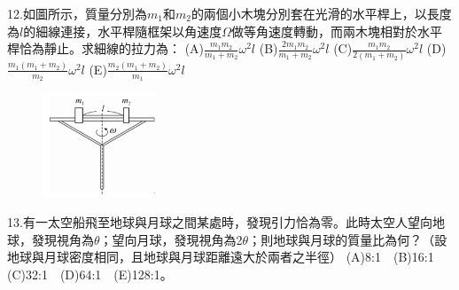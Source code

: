 \documentclass[cn,10pt,math=newtx]{elegantbook}
\begin{document}
\begin{example}
   12.如圖所示，質量分別為$m_1$和$m_2$的兩個小木塊分別套在光滑的水平桿上，以長度為$l$的細線連接，水平桿隨框架以角速度$\Omega$做等角速度轉動，而兩木塊相對於水平桿恰為靜止。求細線的拉力為：
   (A)$\frac{m_1 m_2}{m_1 +m_2} \omega^2 l$ (B)$\frac{2 m_1 m_2}{m_1 +m_2} \omega^2 l$
   (C)$\frac{m_1 m_2}{2(m_1 +m_2)} \omega^2 l$ (D) $\frac{m_1(m_1 +m_2)}{m_2} \omega^2 l$
   (E)$\frac{m_2(m_1 +m_2)}{m_1} \omega^2 l$
   \\
    \rightline{[成德高中教甄109]}
\end{example}
\begin{solution}
    
\end{solution}
\begin{figure}[htbp]
    \flushright
    \includegraphics[width=0.3\textwidth]{image/109成德12.png}
  \end{figure}
\newpage

\begin{example}
   13.有一太空船飛至地球與月球之間某處時，發現引力恰為零。此時太空人望向地球，發現視角為$\theta$；望向月球，發現視角為2$\theta$；則地球與月球的質量比為何？（設地球與月球密度相同，且地球與月球距離遠大於兩者之半徑）
   (A)8:1　(B)16:1　(C)32:1　(D)64:1　(E)128:1。
   \\
    \rightline{[成德高中教甄109]}
\end{example}
\begin{solution}
    
\end{solution}

\newpage
\end{document}
